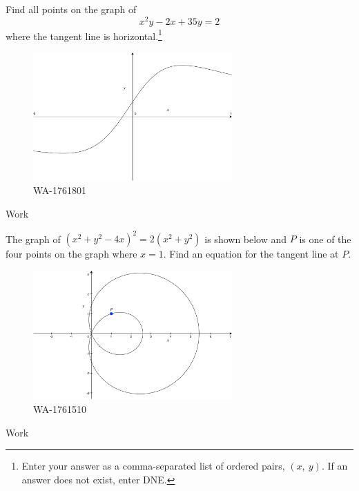 \documentclass[12pt,addpoints, answers, fleqn]{exam}
\begin{document}
\begin{teacher}
\begin{questions}
Find all points on the graph of 
\[
x^2y - 2x + 35y = 2
\]
 where the tangent line is horizontal.\footnote{Enter your answer as a comma-separated list of ordered pairs, 
$\left(x, \ y\right)$. If an answer does not exist, enter DNE.}
 \begin{figure}[htbp] %
   \centering
   \includegraphics[width=3in]{./graphics/1761801.pdf} 
   \caption{	WA-1761801}
   \label{fig:1761801}
\end{figure}
\begin{solution}
Work
\end{solution}
\question 	%

The graph of $\left( x^2 + y^2 - 4x\right)^2 = 2\left(x^2 + y^2\right)$ is shown below and $P$ is one of the four points on the graph where $x = 1$. Find an equation for the tangent line at $P$.
  \begin{figure}[htbp] %
   \centering
   \includegraphics[width=3in]{./graphics/1761510.pdf} 
   \caption{WA-1761510}
   \label{fig:1761510}
\end{figure}
\begin{solution}
Work
\end{solution}
\question 	%



\end{questions}
\end{teacher}
\end{document}
